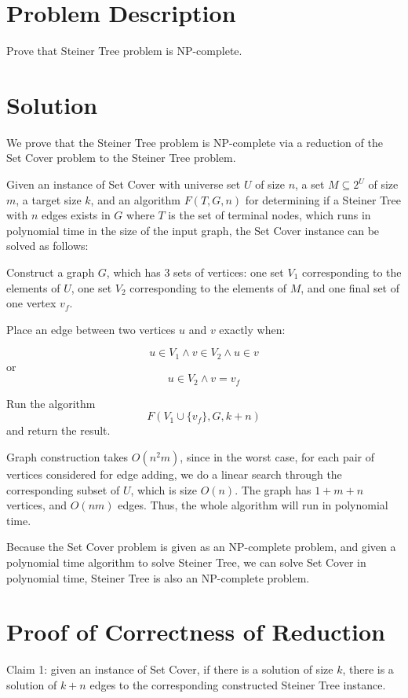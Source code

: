 \documentclass{article}
\begin{document}
\section{Problem Description}

Prove that Steiner Tree problem is NP-complete.

\section{Solution}

We prove that the Steiner Tree problem is NP-complete via a reduction of the
Set Cover problem to the Steiner Tree problem.

Given an instance of Set Cover with universe set $U$ of size $n$, a set $M
\subseteq 2^U$ of size $m$, a target size $k$, and an algorithm $F(T, G, n)$ for
determining if a Steiner Tree with $n$ edges exists in $G$ where $T$ is the
set of terminal nodes, which runs in polynomial time in the size of the input
graph, the Set Cover instance can be solved as follows:

Construct a graph $G$, which has 3 sets of vertices: one set $V_1$ corresponding to
the elements of $U$, one set $V_2$ corresponding to the elements of $M$, and
one final set of one vertex $v_f$.

Place an edge between two vertices $u$ and $v$ exactly when:

$$u \in V_1 \land v \in  V_2 \land u \in v$$
or
$$u \in V_2 \land v = v_f$$

Run the algorithm
$$F(V_1 \cup \{v_f\}, G, k+n)$$ 
and return the result.

Graph construction takes $O(n^2m)$, since in the worst case, for each pair of
vertices considered for edge adding, we do a linear search through the
corresponding subset of $U$, which is size $O(n)$. The graph has $1 + m + n$
vertices, and $O(nm)$ edges. Thus, the whole algorithm will run in polynomial
time.

Because the Set Cover problem is given as an NP-complete problem, and given a
polynomial time algorithm to solve Steiner Tree, we can solve Set Cover in
polynomial time, Steiner Tree is also an NP-complete problem.

\section{Proof of Correctness of Reduction}

Claim 1: given an instance of Set Cover, if there is a solution of size $k$,
there is a solution of $k+n$ edges to the corresponding constructed Steiner
Tree instance.
\end{document}

